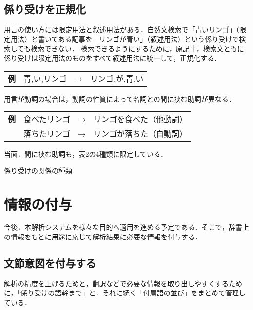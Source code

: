\documentclass[japanese]{jnlp_1.4}
\begin{document}
\subsection{係り受けを正規化}

用言の使い方には限定用法と叙述用法がある．自然文検索で「青いリンゴ」（限定用法）と書いてある記事を「リンゴが青い」（叙述用法）という係り受けで検索しても検索できない．
検索できるようにするために，原記事，検索文ともに係り受けは限定用法のものをすべて叙述用法に統一して，正規化する．

\vspace{0.3zw}
\begin{tabular}{llll}
{\bfseries 例} & 青,い,リンゴ & → & リンゴ,が,青,い \\
\end{tabular}
\vspace{0.3zw}

用言が動詞の場合は，動詞の性質によって名詞との間に挟む助詞が異なる．

\vspace{0.3zw}
\begin{tabular}{llll}
{\bfseries 例} & 食べたリンゴ & → & リンゴを食べた（他動詞）\\
	& 落ちたリンゴ & → & リンゴが落ちた（自動詞）\\
\end{tabular}
\vspace{0.3zw}

当面，間に挟む助詞も，表2の4種類に限定している．

\begin{table}[t]
 \caption{係り受けの関係の種類}

\end{table}



\section{情報の付与}

今後，本解析システムを様々な目的へ適用を進める予定である．そこで，辞書上の情報をもとに用途に応じて解析結果に必要な情報を付与する．


\subsection{文節意図を付与する}

解析の精度を上げるためと，翻訳などで必要な情報を取り出しやすくするために，「係り受けの語幹まで」と，それに続く「付属語の並び」をまとめて管理している．
\end{document}
